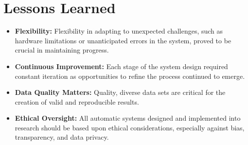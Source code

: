 \section{Lessons Learned}
\begin{itemize}
    \item \textbf{Flexibility:} Flexibility in adapting to unexpected challenges, such as hardware limitations or unanticipated errors in the system, proved to be crucial in maintaining progress.

    \item \textbf{Continuous Improvement:} Each stage of the system design required constant iteration as opportunities to refine the process continued to emerge.

    \item \textbf{Data Quality Matters:} Quality, diverse data sets are critical for the creation of valid and reproducible results.

    \item \textbf{Ethical Oversight:} All automatic systems designed and implemented into research should be based upon ethical considerations, especially against bias, transparency, and data privacy.
\end{itemize}

